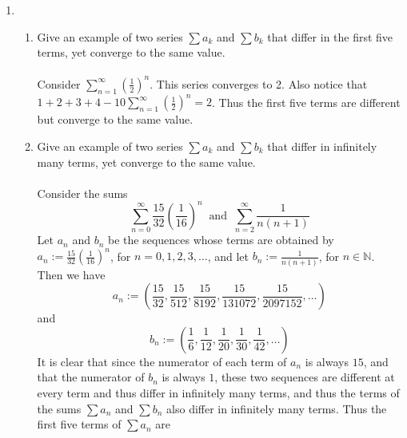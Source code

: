 \documentclass[12pt,letterpaper]{article}
\newcommand{\limx}[2]{\displaystyle\lim\limits_{#1 \to #2}}
\newcommand{\N}{\mathbb{N}}
\theoremstyle{case}
\theoremstyle{definition}
\begin{document}
\begin{enumerate}
\begin{enumerate}
\begin{proof}
\begin{align*}
					&= \limx{n}{\infty} \exp\left\{-\frac{n^2}{n^2-n}\right\} \\
					&= \limx{n}{\infty} \exp \left\{-\frac{n}{n-1}\right\} \\
					&= \limx{n}{\infty} \exp \left\{-\frac{1}{1-\frac{1}{n}}\right\} \\
					&= \exp \left\{-\frac{1}{1-0}\right\} \\
					&= \exp (-1) \\
					&= e^{-1} \\
					&= \frac{1}{e}
				\end{align*}
				By using \textit{L'Hospital's Rule}. Thus by the \textit{$n$th Term Test}, since $\limx{n}{\infty} a_n \neq 0$, we have that the sum $\displaystyle\sum_{n=1}^{\infty} \left(1-\frac{1}{n}\right)^n$ diverges.
			\end{proof}
		\end{enumerate}
		\item 
		\begin{enumerate}
			\item Give an example of two series $\sum a_k$ and $\sum b_k$ that differ in the first five terms, yet converge to the same value.
			\\\\Consider $\displaystyle\sum_{n=1}^{\infty} \left(\frac{1}{2}\right)^n$. This series converges to 2. Also notice that $1+2+3+4-10\displaystyle\sum_{n=1}^{\infty} \left(\frac{1}{2}\right)^n = 2$. Thus the first five terms are different but converge to the same value.\\
			\item Give an example of two series $\sum a_k$ and $\sum b_k$ that differ in infinitely many terms, yet converge to the same value.
			\\\\Consider the sums
			\[\sum_{n=0}^{\infty} \frac{15}{32} \left(\frac{1}{16}\right)^n\ \text{ and }\ \sum_{n=2}^{\infty} \frac{1}{n(n+1)}\]
			Let $a_n$ and $b_n$ be the sequences whose terms are obtained by $a_n:=\frac{15}{32}\left(\frac{1}{16}\right)^n$, for $n =0,1,2,3,\dots$, and let $b_n:=\frac{1}{n(n+1)}$, for $n \in \N$. Then we have 
			\[a_n:=\left(\frac{15}{32}, \frac{15}{512}, \frac{15}{8192}, \frac{15}{131072}, \frac{15}{2097152}, \dots\right)\]
			and
			\[b_n:=\left(\frac{1}{6}, \frac{1}{12}, \frac{1}{20}, \frac{1}{30}, \frac{1}{42},\dots\right)\]
			It is clear that since the numerator of each term of $a_n$ is always $15$, and that the numerator of $b_n$ is always $1$, these two sequences are different at every term and thus differ in infinitely many terms, and thus the terms of the sums $\sum a_n$ and $\sum b_n$ also differ in infinitely many terms. Thus the first five terms of $\sum a_n$ are

\end{enumerate}
\end{enumerate}
\end{document}
